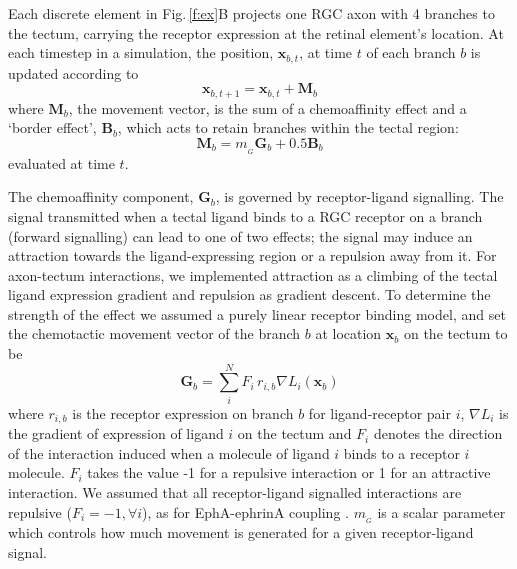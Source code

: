 \documentclass[11pt, a4paper]{article}
\begin{document}
\color{black}
Each discrete element in Fig.\,\ref{f:ex}B projects one RGC axon with 4
branches to the tectum, carrying the receptor expression at the retinal
element's location.
At each timestep in a simulation, the position, $\mathbf{x}_{b,t}$, at time
$t$ of each branch $b$ is updated according to
%
\begin{equation}
\mathbf{x}_{b,t+1} = \mathbf{x}_{b,t} + \mathbf{M}_{b}
\end{equation}
%
where $\mathbf{M}_{b}$, the movement vector, is the sum of a chemoaffinity
effect and a `border effect', $\mathbf{B}_b$, which acts to retain branches
within the tectal region:
%
\begin{equation} \label{e:mv}
\mathbf{M}_{b} = m_{\!_G} \mathbf{G}_b + 0.5 \mathbf{B}_b
\end{equation}
%
evaluated at time $t$.

The chemoaffinity component, $\mathbf{G}_b$, is governed by receptor-ligand
signalling. The signal transmitted when a tectal ligand binds to a RGC
receptor on a branch (forward signalling) can lead to one of two effects; the
signal may induce an attraction towards the ligand-expressing region or a
repulsion away from it.
%
For axon-tectum interactions, we implemented attraction as a climbing of the
tectal ligand expression gradient and repulsion as gradient descent.
%
To determine the strength of the effect we assumed a purely linear receptor
binding model, and set the chemotactic movement vector of the branch $b$ at
location $\mathbf{x}_b$ on the tectum to be
%
\begin{equation}
\mathbf{G}_b = \sum_i^N F_i\,r_{i,b} \nabla L_i(\mathbf{x}_b)
\end{equation}
%
where $r_{i,b}$ is the receptor expression on branch $b$ for ligand-receptor
pair $i$, $\nabla L_i$ is the gradient of expression of ligand $i$ on the
tectum and $F_i$ denotes the direction of the interaction induced when a
molecule of ligand $i$ binds to a receptor $i$ molecule. $F_i$ takes the value
-1 for a repulsive interaction or 1 for an attractive interaction.
%
We assumed that all
receptor-ligand signalled interactions are repulsive ($F_i=-1, \forall i$), as
for EphA-ephrinA
coupling \citep{drescher_vitro_1995,nakamoto_topographically_1996}.
%
$m_{\!_G}$ is a
scalar parameter which controls how much movement is generated for a given
receptor-ligand signal.
\end{document}
